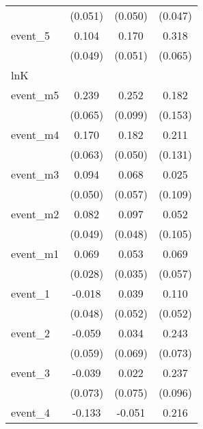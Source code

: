 {\begin{tabular}{l*{3}{c}}
            &     (0.051)         &     (0.050)         &     (0.047)         \\
[1em]
event\_5     &       0.104\sym{*}  &       0.170\sym{***}&       0.318\sym{***}\\
            &     (0.049)         &     (0.051)         &     (0.065)         \\
\hline
lnK         &                     &                     &                     \\
event\_m5    &       0.239\sym{***}&       0.252\sym{*}  &       0.182         \\
            &     (0.065)         &     (0.099)         &     (0.153)         \\
[1em]
event\_m4    &       0.170\sym{**} &       0.182\sym{***}&       0.211         \\
            &     (0.063)         &     (0.050)         &     (0.131)         \\
[1em]
event\_m3    &       0.094         &       0.068         &       0.025         \\
            &     (0.050)         &     (0.057)         &     (0.109)         \\
[1em]
event\_m2    &       0.082         &       0.097\sym{*}  &       0.052         \\
            &     (0.049)         &     (0.048)         &     (0.105)         \\
[1em]
event\_m1    &       0.069\sym{*}  &       0.053         &       0.069         \\
            &     (0.028)         &     (0.035)         &     (0.057)         \\
[1em]
event\_1     &      -0.018         &       0.039         &       0.110\sym{*}  \\
            &     (0.048)         &     (0.052)         &     (0.052)         \\
[1em]
event\_2     &      -0.059         &       0.034         &       0.243\sym{***}\\
            &     (0.059)         &     (0.069)         &     (0.073)         \\
[1em]
event\_3     &      -0.039         &       0.022         &       0.237\sym{*}  \\
            &     (0.073)         &     (0.075)         &     (0.096)         \\
[1em]
event\_4     &      -0.133         &      -0.051         &       0.216\sym{*}  \\

\end{tabular}}
